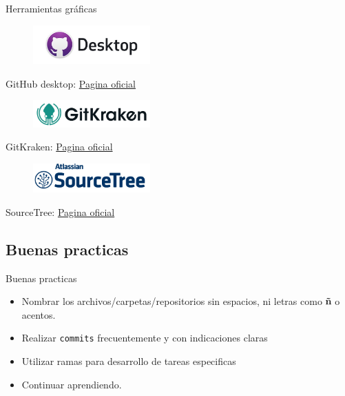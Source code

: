 \documentclass{beamer}
\begin{document}
\begin{frame} {Herramientas gráficas }

    \begin{figure}
      \includegraphics[width=0.4\textwidth]{images/github-desktop.jpg}
    \end{figure}
    GitHub desktop: \href{https://desktop.github.com/}{Pagina oficial}

    \begin{figure}
      \includegraphics[width=0.4\textwidth]{images/gitkraken.jpg}
    \end{figure}
    GitKraken: \href{https://www.gitkraken.com/}{Pagina oficial}

    \begin{figure}
      \includegraphics[width=0.4\textwidth]{images/sourcetree.png}
    \end{figure}

    SourceTree: \href{https://www.sourcetreeapp.com/}{Pagina oficial}


\end{frame}

\subsection {Buenas practicas}
  \begin{frame} {Buenas practicas}
      \begin{itemize}
        \Large
        \item Nombrar los archivos/carpetas/repositorios sin espacios, ni letras como \textbf{ñ} o acentos.
        \item Realizar \texttt{commits} frecuentemente y con indicaciones claras 
        \item Utilizar ramas para desarrollo de tareas especificas
        \item Continuar aprendiendo.
      \end{itemize}
  \end{frame}
\end{document}
